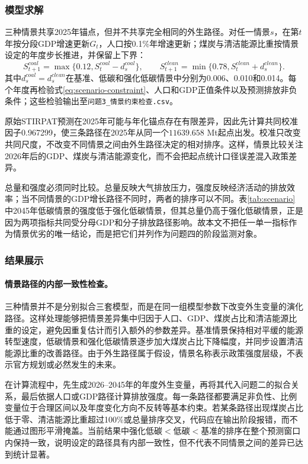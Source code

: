 \documentclass[12pt,a4paper]{ctexart}
\theoremstyle{definition}
\theoremstyle{plain}
\theoremstyle{remark}
\begin{document}
\subsubsection{模型求解}
三种情景共享2025年锚点，但并不共享完全相同的外生路径。对任一情景$s$，在第$t$年按分段GDP增速更新$G_t$，人口按0.1\%年增速更新；煤炭与清洁能源比重按情景设定的年度步长推进，并保留上下界：
\begin{equation}
S_{t+1}^{coal}=\max\{0.12,S_t^{coal}-d_s^{coal}\},\qquad
S_{t+1}^{clean}=\min\{0.78,S_t^{clean}+d_s^{clean}\}.
\label{eq:scenario-path}
\end{equation}
其中$d_s^{coal}=d_s^{clean}$在基准、低碳和强化低碳情景中分别为0.006、0.010和0.014。每个年度再检验式\eqref{eq:scenario-constraint}、人口和GDP正值条件以及预测排放非负条件；这些检验输出至\texttt{问题3\_情景约束检查.csv}。

原始STIRPAT预测在2025年可能与年化锚点存在有限差异，因此先计算共同校准因子0.967299，使三条路径在2025年从同一个$11639.658$ Mt起点出发。校准只改变共同尺度，不改变不同情景之间由外生路径决定的相对排序。这样，情景比较关注2026年后的GDP、煤炭与清洁能源变化，而不会把起点统计口径误差混入政策差异。

总量和强度必须同时比较。总量反映大气排放压力，强度反映经济活动的排放效率；当不同情景的GDP增长路径不同时，两者的排序可以不同。表\ref{tab:scenario}中2045年低碳情景的强度低于强化低碳情景，但其总量仍高于强化低碳情景，正是因为两项指标共同受分母GDP和分子排放路径影响。故本文不把任一单一指标作为情景优劣的唯一结论，而是把它们并列作为问题四的阶段监测对象。
\subsubsection{结果展示}
\paragraph{情景路径的内部一致性检查。}
三种情景并不是分别拟合三套模型，而是在同一组模型参数下改变外生变量的演化路径。这样处理能够把情景差异集中归因于人口、GDP、煤炭占比和清洁能源比重的设定，避免因重复估计而引入额外的参数差异。基准情景保持相对平缓的能源转型速度，低碳情景和强化低碳情景逐步加大煤炭占比下降幅度，并同步设置清洁能源比重的改善路径。由于外生路径属于假设，情景名称表示政策强度层级，不表示官方规划或必然发生的未来。

在计算流程中，先生成2026--2045年的年度外生变量，再将其代入问题二的拟合关系，最后依据人口或GDP路径计算排放强度。每一条路径都要满足非负性、比例变量位于合理区间以及年度变化方向不反转等基本约束。若某条路径出现煤炭占比低于零、清洁能源比重超过100\%或总量排序交叉，代码应在输出阶段报错，而不能通过图形平滑掩盖。当前结果中强化低碳$<$低碳$<$基准的排序在整个预测窗口内保持一致，说明设定的路径具有内部一致性，但不代表不同情景之间的差异已达到统计显著。
\end{document}

